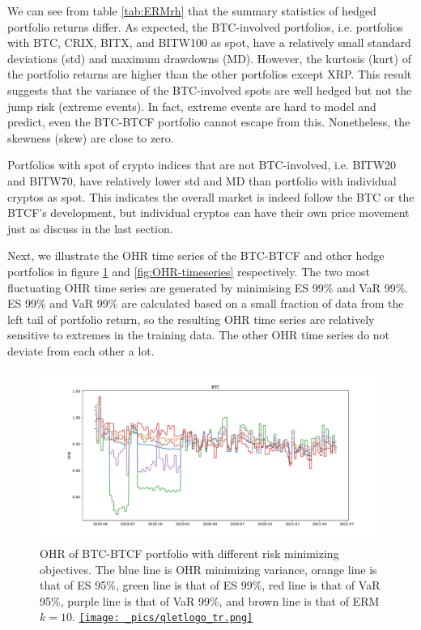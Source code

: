 We can see from table \ref{tab:ERMrh} that the summary statistics of hedged portfolio returns differ.
As expected, the BTC-involved portfolios, i.e. portfolios with BTC, CRIX, BITX, and BITW100 as spot, have a relatively small
standard deviations (std) and maximum drawdowns (MD).
However, the kurtosis (kurt) of the portfolio returns are higher than the other portfolios except XRP.
This result suggests that the variance of the BTC-involved spots are well hedged but not the jump risk (extreme events).
In fact, extreme events are hard to model and predict, even the BTC-BTCF portfolio cannot escape from this.
Nonetheless, the skewness (skew) are close to zero. \medskip

Portfolios with spot of crypto indices that are not BTC-involved, i.e. BITW20 and BITW70, have relatively lower std and MD than portfolio with individual cryptos as spot.
This indicates the overall market is indeed follow the BTC or the BTCF's development, but individual cryptos can have their own price movement just as discuss in the last section. \medskip

Next, we illustrate the OHR time series of the BTC-BTCF and other hedge portfolios in figure \ref{fig:BTCOHR} and \ref{fig:OHR-timeseries} respectively.
The two most fluctuating OHR time series are generated by minimising ES 99\% and VaR 99\%.
ES 99\% and VaR 99\% are calculated based on a small fraction of data from the left tail of portfolio return,
so the resulting OHR time series are relatively sensitive to extremes in the training data.
The other OHR time series do not deviate from each other a lot. \medskip

\begin{figure}[t]
\includegraphics[width=\textwidth]{_pics/BTC_OHR.pdf}
  \caption{OHR of BTC-BTCF portfolio with different risk minimizing objectives. The \textcolor{plt1}{blue line} is OHR minimizing variance,
                                      \textcolor{plt2}{orange line} is that of ES 95\%,
                                      \textcolor{plt3}{green line} is that of ES 99\%,
                                      \textcolor{plt4}{red line} is that of VaR 95\%,
                                      \textcolor{plt5}{purple line} is that of VaR 99\%, and
                                      \textcolor{plt6}{brown line} is that of ERM $k=10$.
  \href{http://www.quantlet.com/}{\texttt{[image: \_pics/qletlogo\_tr.png]}} }
\label{fig:BTCOHR}
\end{figure}


